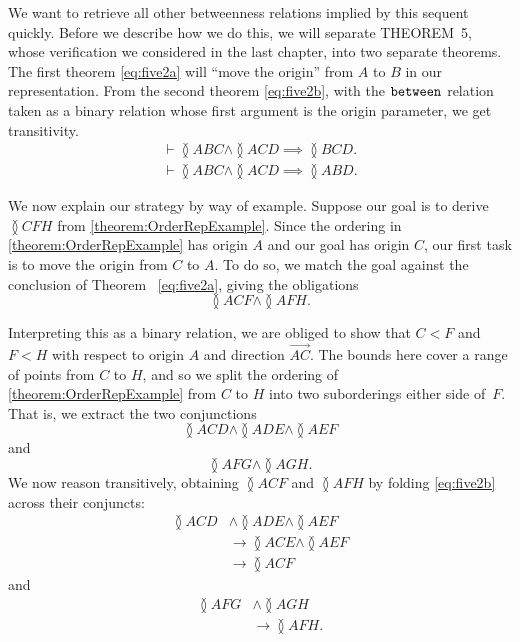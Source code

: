 We want to retrieve all other betweenness relations implied by this sequent quickly. Before we describe how we do this, we will separate THEOREM~5, whose verification we considered in the last chapter, into two separate theorems. The first theorem \eqref{eq:five2a} will ``move the origin'' from $A$ to $B$ in our representation. From the second theorem \eqref{eq:five2b}, with the $\texttt{between}$ relation taken as a binary relation whose first argument is the origin parameter, we get transitivity.
\begin{gather}
\label{eq:five2a}\vdash \between{A}{B}{C} \wedge \between{A}{C}{D} \implies \between{B}{C}{D}.\\
\label{eq:five2b}\vdash \between{A}{B}{C} \wedge \between{A}{C}{D} \implies \between{A}{B}{D}.
\end{gather}

We now explain our strategy by way of example. Suppose our goal is to derive $\between{C}{F}{H}$ from \eqref{theorem:OrderRepExample}. Since the ordering in \eqref{theorem:OrderRepExample} has origin $A$ and our goal has origin $C$, our first task is to move the origin from $C$ to $A$. To do so, we match the goal against the conclusion of Theorem~ \ref{eq:five2a}, giving the obligations
\begin{displaymath}
\between{A}{C}{F} \wedge \between{A}{F}{H}.
\end{displaymath}

Interpreting this as a binary relation, we are obliged to show that $C < F$ and $F < H$ with respect to origin $A$ and direction $\overrightarrow{AC}$. The bounds here cover a range of points from $C$ to $H$, and so we split the ordering of \eqref{theorem:OrderRepExample} from $C$ to $H$ into two suborderings either side of~$F$. That is, we extract the two conjunctions
\begin{displaymath}
\between{A}{C}{D} \wedge \between{A}{D}{E} \wedge\between{A}{E}{F}
\end{displaymath}
and
\begin{displaymath}
\between{A}{F}{G}\wedge\between{A}{G}{H}.
\end{displaymath}
We now reason transitively, obtaining $\between{A}{C}{F}$ and $\between{A}{F}{H}$ by folding \eqref{eq:five2b} across their conjuncts:
\begin{align*}
\between{A}{C}{D} &\wedge \between{A}{D}{E} \wedge\between{A}{E}{F}\\
&\longrightarrow \between{A}{C}{E} \wedge \between{A}{E}{F}\\
&\longrightarrow \between{A}{C}{F}
\end{align*}
and
\begin{align*}
\between{A}{F}{G} &\wedge \between{A}{G}{H}\\
&\longrightarrow \between{A}{F}{H}.
\end{align*}


